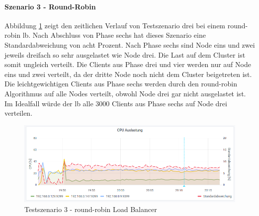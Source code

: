 \paragraph{Szenario 3 - Round-Robin}
Abbildung \ref{fig:s3-rr} zeigt den zeitlichen Verlauf von Testszenario drei bei einem round-robin \ac{lb}.
Nach Abschluss von Phase sechs hat dieses Szenario eine Standardabweichung von acht Prozent.
Nach Phase sechs sind Node eins und zwei jeweils dreifach so sehr ausgelastet wie Node drei. Die Last auf dem Cluster ist somit ungleich verteilt.
Die Clients aus Phase drei und vier werden nur auf Node eins und zwei verteilt, da der dritte Node noch nicht dem Cluster beigetreten ist. Die leichtgewichtigen Clients aus Phase sechs werden durch den round-robin Algorithmus auf alle Nodes verteilt, obwohl Node drei gar nicht ausgelastet ist. Im Idealfall würde der \ac{lb} alle 3000 Clients aus Phase sechs auf Node drei verteilen.
\begin{figure}
    \centering
    \includegraphics[scale=0.8]{images/s3_rr.png}
    \caption{Testszenario 3 - round-robin Load Balancer}
    \label{fig:s3-rr}
\end{figure}

